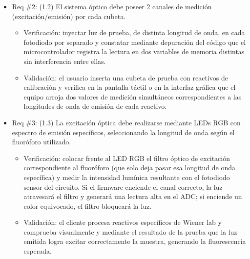 \documentclass[
11pt, %
]{charter}
\begin{document}
\begin{itemize}
\item Req \#2: (1.2) El sistema óptico debe poseer 2 canales de medición (excitación/emisión) por cada cubeta.

\begin{itemize}
	\item Verificación: inyectar luz de prueba, de distinta longitud de onda, en cada fotodiodo por separado y constatar mediante depuración del código que el microcontrolador registra la lectura en dos variables de memoria distintas sin interferencia entre ellas.
	\item Validación: el usuario inserta una cubeta de prueba con reactivos de calibración y verifica en la pantalla táctil o en la interfaz gráfica que el equipo arroja dos valores de medición simultáneos correspondientes a las longitudes de onda de emisión de cada reactivo.
\end{itemize}

\end{itemize}

\begin{itemize}
\item Req \#3: (1.3) La excitación óptica debe realizarse mediante LEDs RGB con espectro de emisión específicos, seleccionando la longitud de onda según el fluoróforo utilizado.

\begin{itemize}
	\item Verificación: colocar frente al LED RGB el filtro óptico de excitación correspondiente al fluoróforo (que solo deja pasar esa longitud de onda específica) y medir la intensidad lumínica resultante con el fotodiodo sensor del circuito. Si el firmware enciende el canal correcto, la luz atravesará el filtro y generará una lectura alta en el ADC; si enciende un color equivocado, el filtro bloqueará la luz.
	\item Validación: el cliente procesa reactivos específicos de Wiener lab  y comprueba visualmente y mediante el resultado de la prueba que la luz emitida logra excitar correctamente la muestra, generando la fluorescencia esperada.
\end{itemize}

\end{itemize}
\end{document}
